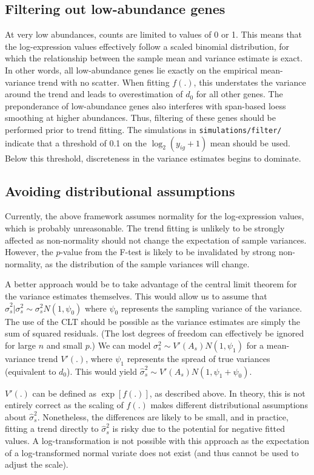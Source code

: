 \documentclass{article}
\begin{document}
\subsection{Filtering out low-abundance genes}
At very low abundances, counts are limited to values of 0 or 1.
This means that the log-expression values effectively follow a scaled binomial distribution, for which the relationship between the sample mean and variance estimate is exact.
In other words, all low-abundance genes lie exactly on the empirical mean-variance trend with no scatter.
When fitting $f(.)$, this understates the variance around the trend and leads to overestimation of $d_0$ for all other genes.
The preponderance of low-abundance genes also interferes with span-based loess smoothing at higher abundances.
Thus, filtering of these genes should be performed prior to trend fitting.
The simulations in \texttt{simulations/filter/} indicate that a threshold of 0.1 on the $\log_2(y_{ig}+1)$ mean should be used.
Below this threshold, discreteness in the variance estimates begins to dominate.

\subsection{Avoiding distributional assumptions}
Currently, the above framework assumes normality for the log-expression values, which is probably unreasonable.
The trend fitting is unlikely to be strongly affected as non-normality should not change the expectation of sample variances.
However, the $p$-value from the F-test is likely to be invalidated by strong non-normality, as the distribution of the sample variances will change.

A better approach would be to take advantage of the central limit theorem for the variance estimates themselves.
This would allow us to assume that $\hat\sigma^2_s|\sigma^2_s \sim \sigma^2_s N(1, \psi_0)$ where $\psi_0$ represents the sampling variance of the variance.
The use of the CLT should be possible as the variance estimates are simply the sum of squared residuals.
(The lost degrees of freedom can effectively be ignored for large $n$ and small $p$.)
We can model $\sigma^2_s \sim V'(A_s)N(1, \psi_1)$ for a mean-variance trend $V'(.)$, where $\psi_1$ represents the spread of true variances (equivalent to $d_0$).
This would yield $\hat\sigma^2_s \sim V'(A_s)N(1, \psi_1 + \psi_0)$.

$V'(.)$ can be defined as $\exp[f(.)]$, as described above.
In theory, this is not entirely correct as the scaling of $f(.)$ makes different distributional assumptions about $\hat\sigma^2_s$.
Nonetheless, the differences are likely to be small, and in practice, fitting a trend directly to $\hat\sigma^2_s$ is risky due to the potential for negative fitted values.
A log-transformation is not possible with this approach as the expectation of a log-transformed normal variate does not exist (and thus cannot be used to adjust the scale).
\end{document}
